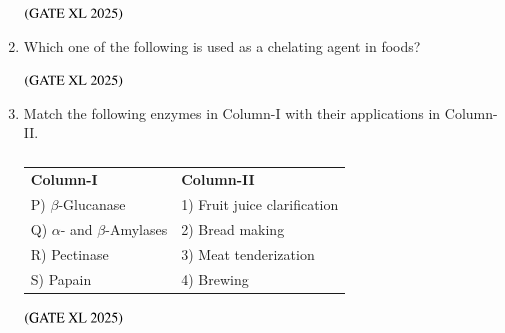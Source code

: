 \documentclass[journal]{IEEEtran}
\begin{document}
\begin{enumerate}
    \hfill $\left(\text{GATE XL 2025}\right)$
    \begin{enumerate}
    \end{enumerate}

    \item Which one of the following is used as a chelating agent in foods?

    \hfill $\left(\text{GATE XL 2025}\right)$
    \begin{enumerate}
    \end{enumerate}

    \item Match the following enzymes in Column-I with their applications in Column-II.

    \begin{table}[H]
        \centering
        \begin{tabular}{ll}
            \textbf{Column-I} & \textbf{Column-II} \\
            P) $\beta$-Glucanase & 1) Fruit juice clarification \\
            Q) $\alpha$- and $\beta$-Amylases & 2) Bread making \\
            R) Pectinase & 3) Meat tenderization \\
            S) Papain & 4) Brewing \\
        \end{tabular}
        \caption*{}
        \label{tab:xl2025_q120}
    \end{table}

    \hfill $\left(\text{GATE XL 2025}\right)$
    \begin{enumerate}
    \end{enumerate}


\end{enumerate}
\end{document}
